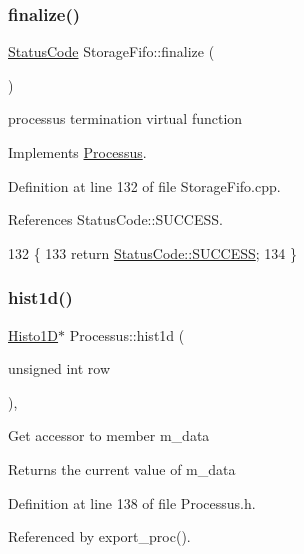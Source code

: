 \subsubsection{\texorpdfstring{finalize()}{finalize()}}
{\footnotesize\ttfamily \hyperlink{classStatusCode}{Status\+Code} Storage\+Fifo\+::finalize (\begin{DoxyParamCaption}{ }\end{DoxyParamCaption})\hspace{0.3cm}{\ttfamily [virtual]}}

processus termination virtual function 

Implements \hyperlink{classProcessus_aba93d691f031bdb18ae4b8afb1b2e856}{Processus}.



Definition at line 132 of file Storage\+Fifo.\+cpp.



References Status\+Code\+::\+S\+U\+C\+C\+E\+SS.


\begin{DoxyCode}
132                                    \{
133   \textcolor{keywordflow}{return} \hyperlink{classStatusCode_a6f565cbeadc76d14c72f047e5e85eb4badd0da38d3ba0d922efd1f4619bc37ad8}{StatusCode::SUCCESS};
134 \}
\end{DoxyCode}
\mbox{\label{classProcessus_a409227db936baff03c0462c1bcfe8069}} 
\subsubsection{\texorpdfstring{hist1d()}{hist1d()}}
{\footnotesize\ttfamily \hyperlink{classHisto1D}{Histo1D}$\ast$ Processus\+::hist1d (\begin{DoxyParamCaption}\item[{unsigned int}]{row }\end{DoxyParamCaption})\hspace{0.3cm}{\ttfamily [inline]}, {\ttfamily [inherited]}}

Get accessor to member m\+\_\+data \begin{DoxyReturn}{Returns}
the current value of m\+\_\+data 
\end{DoxyReturn}


Definition at line 138 of file Processus.\+h.



Referenced by export\+\_\+proc().


